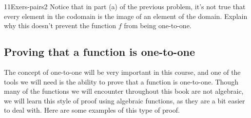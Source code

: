 \begin{exercise}{11Exers-pairs2}
Notice that in part (a) of the previous problem, it's not true that every element in the codomain is the image of an element of the domain. Explain why this doesn't prevent the function $f$ from being one-to-one.
\end{exercise}

\subsection{Proving that a function is one-to-one}

The concept of one-to-one will be very important in this course, and one of the tools we will need is the ability to prove that a function is one-to-one.  Though many of the functions we will encounter throughout this book are not algebraic, we will learn this style of proof using algebraic functions, as they are a bit easier to deal with.  Here are some examples of this type of proof. 

